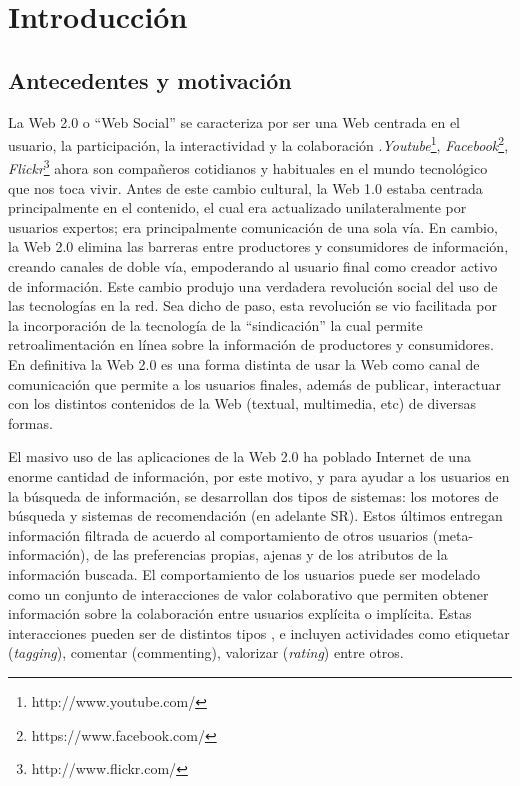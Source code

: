 \chapter{Introducci\'on}
\label{cap:intro}



\section{Antecedentes y motivaci\'on}
\label{intro:motivacion}


La Web 2.0 o ``Web Social'' se caracteriza por ser una Web centrada en el usuario, la participación, la interactividad y la colaboración \citep{Murugesan:2007}.\textit{Youtube}\footnote{http://www.youtube.com/}, \textit{Facebook}\footnote{https://www.facebook.com/}, \textit{Flickr}\footnote{http://www.flickr.com/} ahora son compañeros cotidianos y habituales en el mundo tecnológico que nos toca vivir. Antes de este cambio cultural, la Web 1.0 estaba centrada principalmente en el contenido, el cual era actualizado unilateralmente por usuarios expertos; era principalmente comunicación de una sola vía. En cambio, la Web 2.0 elimina las barreras entre productores y consumidores de información, creando canales de doble vía, empoderando al usuario final como creador activo de información. Este cambio produjo una verdadera revolución social del uso de las tecnologías en la red. Sea dicho de paso, esta revolución se vio facilitada por la incorporación de la tecnología de la  ``sindicación'' la cual permite retroalimentación en línea sobre la información de productores y consumidores. En definitiva la Web 2.0 es una forma distinta de usar la Web como canal de comunicación  \citep{Padula:2009} que permite a los usuarios finales, además de publicar, interactuar con los distintos contenidos de la Web (textual, multimedia, etc) de diversas formas.

El masivo uso de las aplicaciones de la Web 2.0 ha poblado Internet de una enorme cantidad de información, por este motivo, y para ayudar a los usuarios en la búsqueda de información, se desarrollan dos tipos de sistemas: los motores de búsqueda y sistemas de recomendación (en adelante SR). Estos últimos entregan información filtrada de acuerdo al comportamiento de otros usuarios (meta-información), de las preferencias propias, ajenas y de los atributos de la información buscada. El comportamiento de los usuarios puede ser modelado como un conjunto de interacciones de valor colaborativo que permiten obtener información sobre la colaboración entre usuarios explícita o implícita.  Estas interacciones pueden ser de distintos tipos \citep{Dijkman:2011}, e incluyen actividades como  etiquetar (\textit{tagging}), comentar (commenting), valorizar (\textit{rating}) entre otros. 

